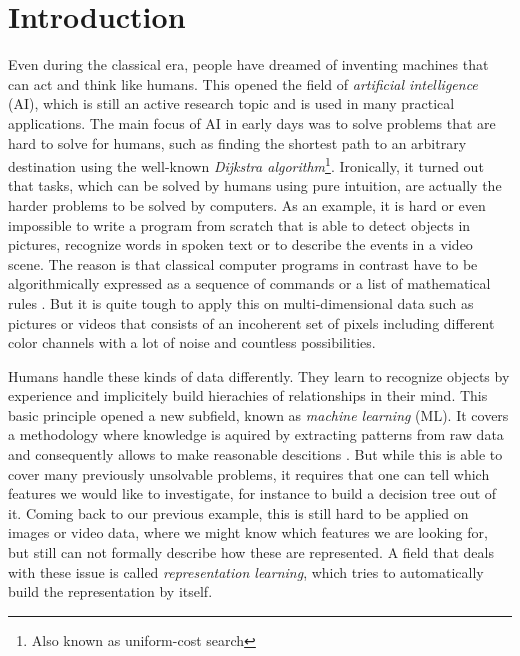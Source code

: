

\chapter{Introduction} \label{chapter:introduction}

Even during the classical era, people have dreamed of inventing machines that can act and think like humans. This opened the field of \textit{artificial intelligence} (AI), which is still an active research topic and is used in many practical applications. The main focus of AI in early days was to solve problems that are hard to solve for humans, such as finding the shortest path to an arbitrary destination using the well-known \textit{Dijkstra algorithm}\footnote{Also known as uniform-cost search}. Ironically, it turned out that tasks, which can be solved by humans using pure intuition, are actually the harder problems to be solved by computers. As an example, it is hard or even impossible to write a program from scratch that is able to detect objects in pictures, recognize words in spoken text or to describe the events in a video scene. The reason is that classical computer programs in contrast have to be algorithmically expressed as a sequence of commands or a list of mathematical rules \parencite{deep_learning}. But it is quite tough to apply this on multi-dimensional data such as pictures or videos that consists of an incoherent set of pixels including different color channels with a lot of noise and countless possibilities. 

Humans handle these kinds of data differently. They learn to recognize objects by experience and implicitely build hierachies of relationships in their mind. This basic principle opened a new subfield, known as \textit{machine learning} (ML). It covers a methodology where knowledge is aquired by extracting patterns from raw data and consequently allows to make reasonable descitions \parencite{deep_learning}. But while this is able to cover many previously unsolvable problems, it requires that one can tell which features we would like to investigate, for instance to build a decision tree out of it. Coming back to our previous example, this is still hard to be applied on images or video data, where we might know which features we are looking for, but still can not formally describe how these are represented. A field that deals with these issue is called \textit{representation learning}, which tries to automatically build the representation by itself.

